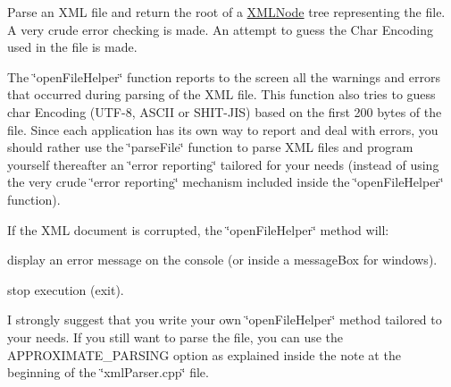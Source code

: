 Parse an X\-M\-L file and return the root of a \hyperlink{structXMLNode}{X\-M\-L\-Node} tree representing the file. A very crude error checking is made. An attempt to guess the Char Encoding used in the file is made. 

The \char`\"{}open\-File\-Helper\char`\"{} function reports to the screen all the warnings and errors that occurred during parsing of the X\-M\-L file. This function also tries to guess char Encoding (U\-T\-F-\/8, A\-S\-C\-I\-I or S\-H\-I\-T-\/\-J\-I\-S) based on the first 200 bytes of the file. Since each application has its own way to report and deal with errors, you should rather use the \char`\"{}parse\-File\char`\"{} function to parse X\-M\-L files and program yourself thereafter an \char`\"{}error reporting\char`\"{} tailored for your needs (instead of using the very crude \char`\"{}error reporting\char`\"{} mechanism included inside the \char`\"{}open\-File\-Helper\char`\"{} function).

If the X\-M\-L document is corrupted, the \char`\"{}open\-File\-Helper\char`\"{} method will\-:
\begin{DoxyItemize}
\item display an error message on the console (or inside a message\-Box for windows).
\item stop execution (exit).
\end{DoxyItemize}

I strongly suggest that you write your own \char`\"{}open\-File\-Helper\char`\"{} method tailored to your needs. If you still want to parse the file, you can use the A\-P\-P\-R\-O\-X\-I\-M\-A\-T\-E\-\_\-\-P\-A\-R\-S\-I\-N\-G option as explained inside the note at the beginning of the \char`\"{}xml\-Parser.\-cpp\char`\"{} file.


